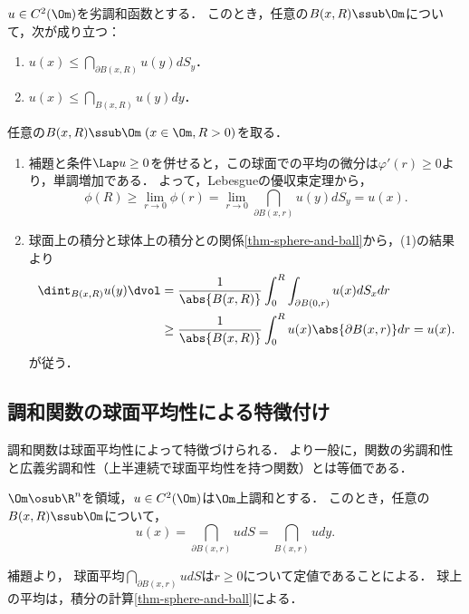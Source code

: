 \documentclass[uplatex,dvipdfmx]{jsreport}
\begin{document}
\begin{theorem}[劣調和関数の平均定理]\label{thm-mean-value-theorem-of-subharmonic-function}
    $u\in C^2(\Om)$を劣調和函数とする．
    このとき，任意の$B(x,R)\ssub\Om$について，次が成り立つ：
    \begin{enumerate}
        \item $u(x)\le\dint_{\partial B(x,R)}u(y)dS_y$．
        \item $u(x)\le\dint_{B(x,R)}u(y)dy$．
    \end{enumerate}
\end{theorem}
\begin{Proof}
    任意の$B(x,R)\ssub\Om\;(x\in\Om,R>0)$を取る．
    \begin{enumerate}
        \item 補題と条件$\Lap u\ge0$を併せると，この球面での平均の微分は$\varphi'(r)\ge0$より，単調増加である．
        よって，Lebesgueの優収束定理から，
        \[\phi(R)\ge\lim_{r\to0}\phi(r)=\lim_{r\to0}\dint_{\partial B(x,r)}u(y)dS_y=u(x).\]
        \item 球面上の積分と球体上の積分との関係\ref{thm-sphere-and-ball}から，(1)の結果より
        \begin{align*}
            \dint_{B(x,R)}u(y)\dvol&=\frac{1}{\abs{B(x,R)}}\int^R_0\int_{\partial B(0,r)}u(x)dS_xdr\\
            &\ge\frac{1}{\abs{B(x,R)}}\int^R_0u(x)\abs{\partial B(x,r)}dr=u(x).
        \end{align*}
        が従う．
    \end{enumerate}
\end{Proof}

\subsection{調和関数の球面平均性による特徴付け}

\begin{tcolorbox}[colframe=ForestGreen, colback=ForestGreen!10!white,breakable,colbacktitle=ForestGreen!40!white,coltitle=black,fonttitle=\bfseries\sffamily,
title=]
    調和関数は球面平均性によって特徴づけられる．
    より一般に，関数の劣調和性と広義劣調和性（上半連続で球面平均性を持つ関数）とは等価である．
\end{tcolorbox}

\begin{corollary}[調和関数の球面平均定理]\label{cor-surface-avarage-of-harmonic-functions}
    $\Om\osub\R^n$を領域，$u\in C^2(\Om)$は$\Om$上調和とする．
    このとき，任意の$B(x,R)\ssub\Om$について，
    \[u(x)=\dint_{\partial B(x,r)}udS=\dint_{B(x,r)}udy.\]
\end{corollary}
\begin{Proof}
    補題より，
    球面平均$\dint_{\partial B(x,r)}udS$は$r\ge0$について定値であることによる．
    球上の平均は，積分の計算\ref{thm-sphere-and-ball}による．
\end{Proof}
\end{document}
